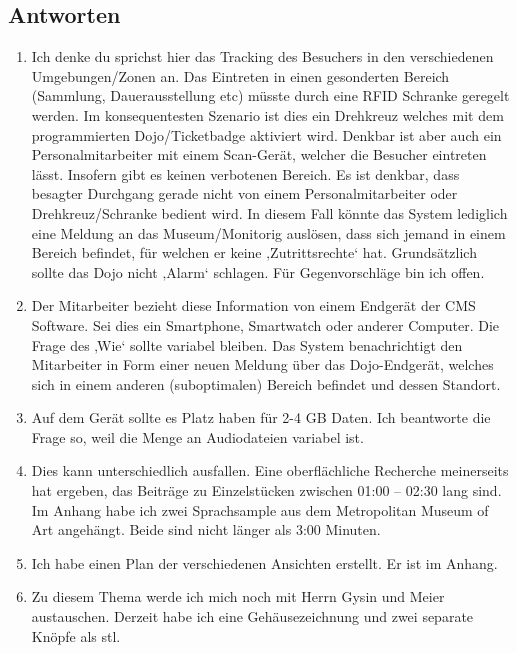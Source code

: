 \newpage
\subsection*{Antworten}
\begin{enumerate}
\item Ich denke du sprichst hier das Tracking des Besuchers in den verschiedenen Umgebungen/Zonen an. Das Eintreten in einen gesonderten Bereich (Sammlung, Dauerausstellung etc) müsste durch eine RFID Schranke geregelt werden. Im konsequentesten Szenario ist dies ein Drehkreuz welches mit dem programmierten Dojo/Ticketbadge aktiviert wird. Denkbar ist aber auch ein Personalmitarbeiter mit einem Scan-Gerät, welcher die Besucher eintreten lässt. Insofern gibt es keinen verbotenen Bereich. Es ist denkbar, dass besagter Durchgang gerade nicht von einem Personalmitarbeiter oder Drehkreuz/Schranke bedient wird. In diesem Fall könnte das System lediglich eine Meldung an das Museum/Monitorig auslösen, dass sich jemand in einem Bereich befindet, für welchen er keine ‚Zutrittsrechte‘ hat. Grundsätzlich sollte das Dojo nicht ‚Alarm‘ schlagen. 
Für Gegenvorschläge bin ich offen.

\item Der Mitarbeiter bezieht diese Information von einem Endgerät der CMS Software. Sei dies ein Smartphone, Smartwatch oder anderer Computer. Die Frage des ‚Wie‘ sollte variabel bleiben. Das System benachrichtigt den Mitarbeiter in Form einer neuen Meldung über das Dojo-Endgerät, welches sich in einem anderen (suboptimalen) Bereich befindet und dessen Standort.

\item Auf dem Gerät sollte es Platz haben für 2-4 GB Daten. Ich beantworte die Frage so, weil die Menge an Audiodateien variabel ist.

\item Dies kann unterschiedlich ausfallen. Eine oberflächliche Recherche meinerseits hat ergeben, das Beiträge zu Einzelstücken zwischen 01:00 – 02:30 lang sind.
Im Anhang habe ich zwei Sprachsample aus dem Metropolitan Museum of Art angehängt. Beide sind nicht länger als 3:00 Minuten.

\item Ich habe einen Plan der verschiedenen Ansichten erstellt. Er ist im Anhang.

\item Zu diesem Thema werde ich mich noch mit Herrn Gysin und Meier austauschen. Derzeit habe ich eine Gehäusezeichnung und zwei separate Knöpfe als stl.


\end{enumerate}
